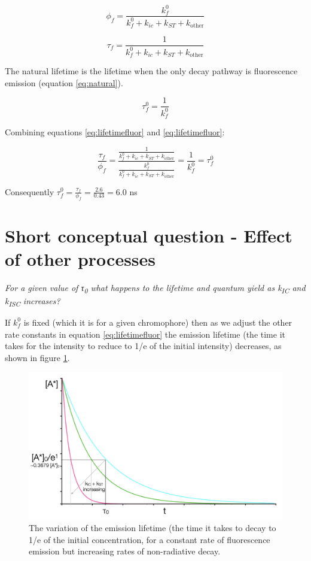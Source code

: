 \documentclass[
]{book}
\begin{document}
\begin{equation}
\phi_f = \frac{k_f^0}{k_f^0+k_{ic}+ k_{ST}+k_{\textrm{other}}}
\label{eq:QYfluor}
\end{equation}

\begin{equation}
\tau_f = \frac{1}{k_f^0+k_{ic}+ k_{ST}+k_{\textrm{other}}}
\label{eq:lifetimefluor}
\end{equation}

The natural lifetime is the lifetime when the only decay pathway is fluorescence emission (equation \eqref{eq:natural}).

\begin{equation}
\tau_f^0 = \frac{1}{k_f^0}
\label{eq:natural}
\end{equation}

Combining equations \eqref{eq:lifetimefluor} and \eqref{eq:lifetimefluor}:

\begin{equation*}
\frac{\tau_f}{\phi_f}=\frac{\frac{1}{k_f^0+k_{ic}+ k_{ST}+k_{\textrm{other}}}}{\frac{k_f^0}{k_f^0+k_{ic}+ k_{ST}+k_{\textrm{other}}}}=\frac{1}{k_f^0}=\tau_f^0
\end{equation*}

Consequently \(\tau_f^0 = \frac{\tau_f}{\phi_f}=\frac{2.6}{0.43}= 6.0\) ns

\hypertarget{sec:otherprocesses}{%
\section{Short conceptual question - Effect of other processes}\label{sec:otherprocesses}}

\emph{For a given value of τ\textsubscript{0} what happens to the lifetime and quantum yield as k\textsubscript{IC} and k\textsubscript{ISC} increases?}

If \(k_f^0\) is fixed (which it is for a given chromophore) then as we adjust the other rate constants in equation \eqref{eq:lifetimefluor} the emission lifetime (the time it takes for the intensity to reduce to 1/e of the initial intensity) decreases, as shown in figure \ref{fig:rateslifetime}.

\begin{figure}

{\centering \includegraphics[width=0.7\linewidth]{images/rateslifetime} 

}

\caption{The variation of the emission lifetime (the time it takes to decay to 1/e of the initial concentration, for a constant rate of fluorescence emission but increasing rates of non-radiative decay.}\label{fig:rateslifetime}
\end{figure}
\end{document}
